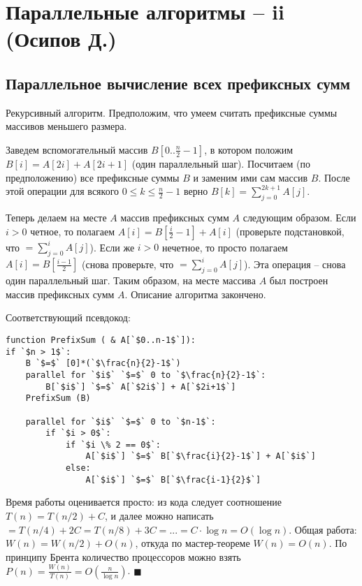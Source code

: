 \section{Параллельные алгоритмы -- ii (Осипов Д.)}
\subsection{Параллельное вычисление всех префиксных сумм}

 Рекурсивный алгоритм. Предположим, что умеем считать префиксные суммы массивов меньшего размера. 

Заведем вспомогательный массив $B[0..\frac{n}{2}-1]$, в котором положим $B[i]=A[2i]+A[2i+1]$ (один параллельный шаг). Посчитаем (по предположению) все префиксные суммы $B$ и заменим ими сам массив $B$. После этой операции для всякого $0 \leq k \leq \frac{n}{2}-1$ верно $B[k] = \sum_{j=0}^{2k+1} A[j]$. 

Теперь делаем на месте $A$ массив префиксных сумм $A$ следующим образом. Если $i > 0$ четное, то полагаем $A[i] = B[\frac{i}{2}-1] + A[i]$ (проверьте подстановкой, что $=\sum_{j=0}^{i}A[j]$). Если же $i > 0$ нечетное, то просто полагаем $A[i] = B[\frac{i-1}{2}]$ (снова проверьте, что $=\sum_{j=0}^{i}A[j]$). Эта операция -- снова один параллельный шаг. Таким образом, на месте массива $A$ был построен массив префиксных сумм $A$. Описание алгоритма закончено.

Соответствующий псевдокод:
\begin{lstlisting}[escapeinside=``]
function PrefixSum ( & A[`$0..n-1$`]):
if `$n > 1$`: 
    B `$=$` [0]*(`$\frac{n}{2}-1$`)
    parallel for `$i$` `$=$` 0 to `$\frac{n}{2}-1$`:
        B[`$i$`] `$=$` A[`$2i$`] + A[`$2i+1$`]
    PrefixSum (B)
    
    parallel for `$i$` `$=$` 0 to `$n-1$`:
        if `$i > 0$`:
            if `$i \% 2 == 0$`:
                A[`$i$`] `$=$` B[`$\frac{i}{2}-1$`] + A[`$i$`]
            else:
                A[`$i$`] `$=$` B[`$\frac{i-1}{2}$`]
\end{lstlisting}

Время работы оценивается просто: из кода следует соотношение $T(n) = T(n/2) + C$, и далее можно написать $= T(n/4) + 2C = T(n/8) + 3C = ... = C\cdot\log n = O(\log n)$. Общая работа: $W(n) = W(n/2) + O(n)$, откуда по мастер-теореме $W(n) = O(n)$. По принципу Брента количество процессоров можно взять $P(n) = \frac{W(n)}{T(n)} = O(\frac{n}{\log n})$. $\blacksquare$

